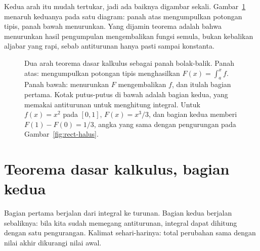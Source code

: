 Kedua arah itu mudah tertukar, jadi ada baiknya digambar sekali.
Gambar~\ref{fig:tdk-dua-arah} menaruh keduanya pada satu diagram: panah atas
mengumpulkan potongan tipis, panah bawah menurunkan. Yang dijamin teorema adalah bahwa
menurunkan hasil pengumpulan mengembalikan fungsi semula, bukan kebalikan aljabar yang
rapi, sebab antiturunan hanya pasti sampai konstanta.

\begin{figure}[htbp]
\centering
{}
\caption{Dua arah teorema dasar kalkulus sebagai panah bolak-balik. Panah atas:
mengumpulkan potongan tipis menghasilkan $F(x)=\int_a^x f$. Panah bawah: menurunkan $F$
mengembalikan $f$, dan itulah bagian pertama. Kotak putus-putus di bawah adalah bagian
kedua, yang memakai antiturunan untuk menghitung integral. Untuk $f(x)=x^2$ pada
$[0,1]$, $F(x)=x^3/3$, dan bagian kedua memberi $F(1)-F(0)=1/3$, angka yang sama dengan
pengurungan pada Gambar~\ref{fig:rect-halus}.}
\label{fig:tdk-dua-arah}
\end{figure}

\section{Teorema dasar kalkulus, bagian kedua}

Bagian pertama berjalan dari integral ke turunan. Bagian kedua berjalan sebaliknya:
bila kita sudah memegang antiturunan, integral dapat dihitung dengan satu pengurangan.
Kalimat sehari-harinya: total perubahan sama dengan nilai akhir dikurangi nilai awal.

